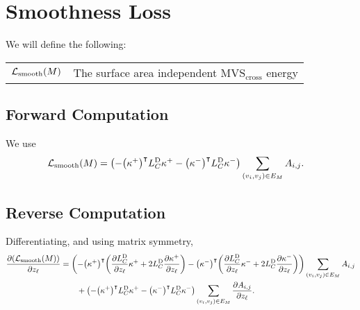 

\section{Smoothness Loss}

We will define the following: \begin{center}\begin{tabular}{r|l}
	\(\mathcal{L}_{\mathrm{smooth}}\pof{M}\) & The surface area independent \(\text{MVS}_{\text{cross}}\) energy \cite{Joshi2007EnergyMF}
\end{tabular}\end{center}

\subsection{Forward Computation}
We use \begin{align*}
	\mathcal{L}_{\mathrm{smooth}}\pof{M} &= \pof{-\pof{\kappa^+}^\intercal L_C^{\text{D}}\kappa^+ - \pof{\kappa^-}^\intercal L_C^{\text{D}}\kappa^-} \sum_{\pof{v_i, v_j} \in E_M} A_{i, j}.
\end{align*}

\subsection{Reverse Computation}
Differentiating, and using matrix symmetry, \begin{align*}
	\frac{\partial\pof{\mathcal{L}_{\mathrm{smooth}}\pof{M}}}{\partial z_\ell} &= \pof{-\pof{\kappa^+}^\intercal\pof{\frac{\partial L_C^{\text{D}}}{\partial z_\ell}\kappa^+ + 2L_C^{\text{D}}\frac{\partial\kappa^+}{\partial z_\ell}} - \pof{\kappa^-}^\intercal\pof{\frac{\partial L_C^{\text{D}}}{\partial z_\ell}\kappa^- + 2L_C^{\text{D}}\frac{\partial\kappa^-}{\partial z_\ell}}} \sum_{\pof{v_i, v_j} \in E_M} A_{i, j} \\
		&\qquad+ \pof{-\pof{\kappa^+}^\intercal L_C^{\text{D}}\kappa^+ - \pof{\kappa^-}^\intercal L_C^{\text{D}}\kappa^-} \sum_{\pof{v_i, v_j} \in E_M} \frac{\partial A_{i, j}}{\partial z_\ell}.
\end{align*}
